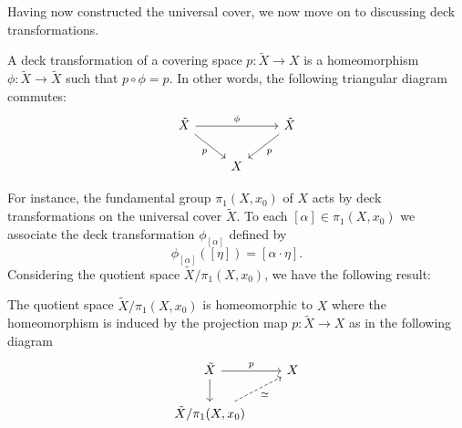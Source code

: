 \documentclass{report}
\begin{document}
Having now constructed the universal cover, we now move on to discussing deck transformations.
\begin{definition}
    A deck transformation of a covering space $p: \tilde X \to X$ is a homeomorphism $\phi: \tilde X \to \tilde X$ such that $p \circ \phi = p$.
    In other words, the following triangular diagram commutes:
    \[
    \begin{tikzcd}
        \tilde X \arrow[rr, "\phi"] \arrow[rd, "p"'] & & \tilde X \arrow[ld, "p"] \\
        & X &
    \end{tikzcd}
    \]
\end{definition}
For instance, the fundamental group $\pi_1(X, x_0)$ of $X$ acts by deck transformations on the universal cover $\tilde X$.
To each $[\alpha] \in \pi_1(X, x_0)$ we associate the deck transformation $\phi_{[\alpha]}$ defined by
\[
\phi_{[\alpha]}([\eta]) = [\alpha \cdot \eta].
\]
Considering the quotient space $\tilde X / \pi_1(X, x_0)$, we have the following result:
\begin{theorem}
    The quotient space $\tilde X / \pi_1(X, x_0)$ is homeomorphic to $X$ where the homeomorphism is induced by the projection map $p: \tilde X \to X$ as in the following diagram
    \[
    \begin{tikzcd}
        \tilde X \arrow[r, "p"] \arrow[d] & X \\
        \tilde X / \pi_1(X, x_0) \arrow[ur, "\simeq"', dashed]
    \end{tikzcd}
    \]
\end{theorem}
\printbibliography
\end{document}
